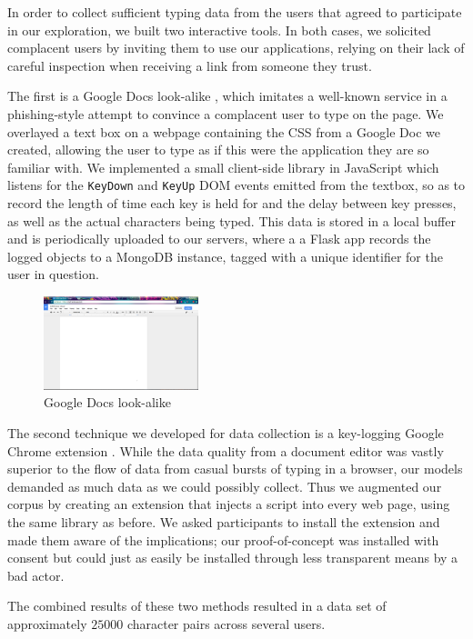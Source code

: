 \documentclass[9pt,journal]{IEEEtran}
\begin{document}
In order to collect sufficient typing data from the users that agreed to participate in our exploration, we built two interactive tools. In both cases, we solicited complacent users by inviting them to use our applications, relying on their lack of careful inspection when receiving a link from someone they trust.

The first is a Google Docs look-alike \cite{gdocs}, which imitates a well-known service in a phishing-style attempt to convince a complacent user to type on the page. We overlayed a text box on a webpage containing the CSS from a Google Doc we created, allowing the user to type as if this were the application they are so familiar with. We implemented a small client-side library in JavaScript which listens for the \texttt{KeyDown} and \texttt{KeyUp} DOM events emitted from the textbox, so as to record the length of time each key is held for and the delay between key presses, as well as the actual characters being typed. This data is stored in a local buffer and is periodically uploaded to our servers, where a a Flask app records the logged objects to a MongoDB instance, tagged with a unique identifier for the user in question.

\begin{figure}[H]
  \centering
  \includegraphics[width=0.4\textwidth]{gdocs}
  \caption{Google Docs look-alike}
\end{figure}

The second technique we developed for data collection is a key-logging Google Chrome extension \cite{extension}. While the data quality from a document editor was vastly superior to the flow of data from casual bursts of typing in a browser, our models demanded as much data as we could possibly collect. Thus we augmented our corpus by creating an extension that injects a script into every web page, using the same library as before. We asked participants to install the extension and made them aware of the implications; our proof-of-concept was installed with consent but could just as easily be installed through less transparent means by a bad actor.

The combined results of these two methods resulted in a data set of approximately $25000$ character pairs across several users.
\end{document}
